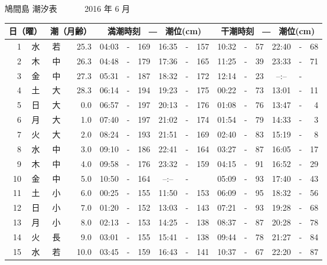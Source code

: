 \documentclass[12pt.a4j]{jsarticle}
\begin{document}
\begin{center}
\begin{table}[ht]
\begin{tabular}{|rc|cr|ccrccr|ccrccr|}
   \hline
   \end{tabular}
\end{table}
\newpage
 {\LARGE 鳩間島  潮汐表　　　}
 {\large 2016 年  6 月}\\
 \begin{table}[ht]
    \begin{tabular}{|rc|cr|ccrccr|ccrccr|}
    \hline
    \multicolumn{2}{|c|}{日（曜）} & \multicolumn{2}{c|}{潮（月齢）} & \multicolumn{6}{c|}{満潮時刻　―　潮位(cm)} & \multicolumn{6}{c|}{干潮時刻　―　潮位(cm)} \\
 \hline
 1 & 水 & 若 & 25.3 &  04:03 &-& 169  &  16:35 &-& 157  &   10:32 &-&  57  &   22:40 &-&  68  \\
 2 & 木 & 中 & 26.3 &  04:48 &-& 179  &  17:36 &-& 165  &   11:25 &-&  39  &   23:33 &-&  71  \\
 3 & 金 & 中 & 27.3 &  05:31 &-& 187  &  18:32 &-& 172  &   12:14 &-&  23  &   --:-- &-&     \\
 4 & 土 & 大 & 28.3 &  06:14 &-& 194  &  19:23 &-& 175  &   00:22 &-&  73  &   13:01 &-&  11  \\
 5 & 日 & 大 &  0.0 &  06:57 &-& 197  &  20:13 &-& 176  &   01:08 &-&  76  &   13:47 &-&   4  \\
 6 & 月 & 大 &  1.0 &  07:40 &-& 197  &  21:02 &-& 174  &   01:54 &-&  79  &   14:33 &-&   3  \\
 7 & 火 & 大 &  2.0 &  08:24 &-& 193  &  21:51 &-& 169  &   02:40 &-&  83  &   15:19 &-&   8  \\
 8 & 水 & 中 &  3.0 &  09:10 &-& 186  &  22:41 &-& 164  &   03:27 &-&  87  &   16:05 &-&  17  \\
 9 & 木 & 中 &  4.0 &  09:58 &-& 176  &  23:32 &-& 159  &   04:15 &-&  91  &   16:52 &-&  29  \\
10 & 金 & 中 &  5.0 &  10:50 &-& 164  &  --:-- &-&     &   05:09 &-&  93  &   17:40 &-&  43  \\
11 & 土 & 小 &  6.0 &  00:25 &-& 155  &  11:50 &-& 153  &   06:09 &-&  95  &   18:32 &-&  56  \\
12 & 日 & 小 &  7.0 &  01:20 &-& 152  &  13:03 &-& 143  &   07:21 &-&  93  &   19:28 &-&  68  \\
13 & 月 & 小 &  8.0 &  02:13 &-& 153  &  14:25 &-& 138  &   08:37 &-&  87  &   20:28 &-&  78  \\
14 & 火 & 長 &  9.0 &  03:01 &-& 155  &  15:41 &-& 138  &   09:44 &-&  78  &   21:27 &-&  84  \\
15 & 水 & 若 & 10.0 &  03:45 &-& 159  &  16:43 &-& 141  &   10:37 &-&  67  &   22:20 &-&  87  \\

\end{tabular}
\end{table}
\end{center}
\end{document}
